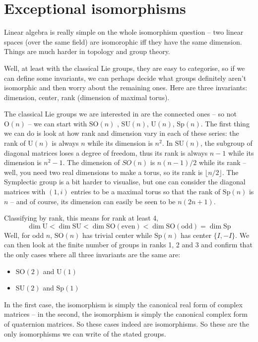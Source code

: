 \documentclass{article}
\newcommand{\gSO}{\mathrm{SO}}
\newcommand{\gSU}{\mathrm{SU}}
\newcommand{\gO}{\mathrm{O}}
\newcommand{\gU}{\mathrm{U}}
\newcommand{\gSp}{\mathrm{Sp}}
\begin{document}
\section{Exceptional isomorphisms}

Linear algebra is really simple on the whole isomorphism question -- two linear spaces (over the same field) are isomorophic iff they have the same dimension. Things are much harder in topology and group theory.

Well, at least with the classical Lie groups, they are easy to categorise, so if we can define some invariants, we can perhaps decide what groups definitely aren't isomorphic and then worry about the remaining ones. Here are three invariants: dimension, center, rank (dimension of maximal torus).

The classical Lie groups we are interested in are the connected ones -- so not $\gO(n)$ -- we can start with $\gSO(n)$ , $\gSU(n)$, $\gU(n)$, $\gSp(n)$. The first thing we can do is look at how rank and dimension vary in each of these series: the rank of $\gU(n)$ is always $n$  while its dimension is $n^2$. In $\gSU(n)$, the subgroup of diagonal matrices loses a degree of freedom, thus its rank is always $n-1$ while its dimension is $n^2-1$. The dimension of $SO(n)$ is $n(n-1)/2$ while its rank -- well, you need two real dimensions to make a torus, so its rank is $\lfloor n / 2\rfloor$. The Symplectic group is a bit harder to visualise, but one can consider the diagonal matrices with $(1,i)$ entries to be a maximal torus so that the rank of $\gSp(n)$ is $n$ -- and of course, its dimension can easily be seen to be $n(2n+1)$.

Classifying by rank, this means for rank at least 4, 
$$\dim \gU<\dim \gSU<\dim \gSO(\mathrm{even})<\dim\gSO(\mathrm{odd})=\dim\gSp$$
Well, for odd $n$, $\gSO(n)$ has trivial center while $\gSp(n)$ has center $\{I, -I\}$. We can then look at the finite number of groups in ranks 1, 2 and 3 and confirm that the only cases where all three invariants are the same are:
\begin{itemize}
    \item $\gSO(2)$ and $\gU(1)$
    \item $\gSU(2)$ and $\gSp(1)$
\end{itemize}
In the first case, the isomorphism is simply the canonical real form of complex matrices -- in the second, the isomorphism is simply the canonical complex form of quaternion matrices. So these cases indeed are isomorphisms. So these are the only isomorphisms we can write of the stated groups.
\end{document}
